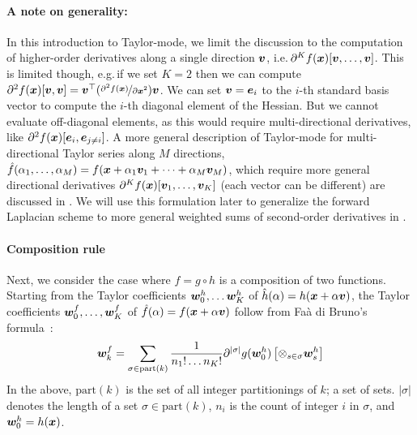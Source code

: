 \paragraph{A note on generality:} In this introduction to Taylor-mode, we limit the discussion to the computation of higher-order derivatives along a single direction ${\bm{v}}$, i.e.\,$\partial^Kf({\bm{x}})[{\bm{v}}, \dots, {\bm{v}}]$.
This is limited though, e.g.\,if we set $K=2$ then we can compute $\partial^2 f({\bm{x}})[{\bm{v}}, {\bm{v}}] = {\bm{v}}^{\top} (\nicefrac{\partial^2 f({\bm{x}})}{\partial{\bm{x}}^2}) {\bm{v}}$.
We can set ${\bm{v}} = {\bm{e}}_i$ to the $i$-th standard basis vector to compute the $i$-th diagonal element of the Hessian.
But we cannot evaluate off-diagonal elements, as this would require multi-directional derivatives, like $\partial^2 f({\bm{x}}) [{\bm{e}}_i, {\bm{e}}_{j\neq i}]$.
A more general description of Taylor-mode for multi-directional Taylor series along $M$ directions, $\hat{f}(\alpha_1, \dots, \alpha_M) = f({\bm{x}} + \alpha_1 {\bm{v}}_1 + \dots + \alpha_M {\bm{v}}_M)$, which require more general directional derivatives $\partial^K f({\bm{x}}) [{\bm{v}}_1, \dots, {\bm{v}}_K]$ (each vector can be different) are discussed in \cite{johnson2021taylor-made}.
We will use this formulation later to generalize the forward Laplacian scheme to more general weighted sums of second-order derivatives in .

\paragraph{Composition rule}
Next, we consider the case where $f = g \circ h$ is a composition of two functions. Starting from the Taylor coefficients ${\bm{w}}_0^h, \dots {\bm{w}}_K^h$ of $\hat{h}(\alpha) = h({\bm{x}} + \alpha {\bm{v}})$, the Taylor coefficients ${\bm{w}}_0^f, \dots, {\bm{w}}_K^f$ of $\hat{f}(\alpha) = f({\bm{x}} + \alpha{\bm{v}})$ follow from Fa\`a di Bruno's formula~\cite{griewank2008evaluating,bettencourt2019taylor}:
\begin{align}\label{eq:taylor-mode-forward}
  {\bm{w}}_{k}^f
  =
  \sum_{\sigma \in \mathrm{part}(k)}
  \frac{1}{n_1! \dots n_K!}
  \partial^{|\sigma|}g({\bm{w}}_0^h)
  \left[
  \otimes_{s \in \sigma}
  {\bm{w}}_s^h
  \right]
\end{align}
In the above, $\mathrm{part}(k)$ is the set of all integer partitionings of $k$; a set of sets. $|\sigma|$ denotes the length of a set $\sigma \in \mathrm{part}(k)$, $n_i$ is the count of integer $i$ in $\sigma$, and ${\bm{w}}_0^h = h({\bm{x}})$.

